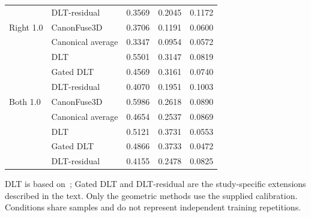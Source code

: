 \begin{table}[htbp]
\begin{tabular}{llrrr}
 & DLT-residual & 0.3569 & 0.2045 & 0.1172 \\
Right 1.0 & CanonFuse3D & 0.3706 & 0.1191 & 0.0600 \\
 & Canonical average & 0.3347 & 0.0954 & 0.0572 \\
 & DLT & 0.5501 & 0.3147 & 0.0819 \\
 & Gated DLT & 0.4569 & 0.3161 & 0.0740 \\
 & DLT-residual & 0.4070 & 0.1951 & 0.1003 \\
Both 1.0 & CanonFuse3D & 0.5986 & 0.2618 & 0.0890 \\
 & Canonical average & 0.4654 & 0.2537 & 0.0869 \\
 & DLT & 0.5121 & 0.3731 & 0.0553 \\
 & Gated DLT & 0.4866 & 0.3733 & 0.0472 \\
 & DLT-residual & 0.4155 & 0.2478 & 0.0825 \\
\bottomrule
\end{tabular}
\par\smallskip\begin{minipage}{\linewidth}\footnotesize DLT is based on~\cite{hartley2004multiple}; Gated DLT and DLT-residual are the study-specific extensions described in the text. Only the geometric methods use the supplied calibration. Conditions share samples and do not represent independent training repetitions.\end{minipage}
\end{table}

